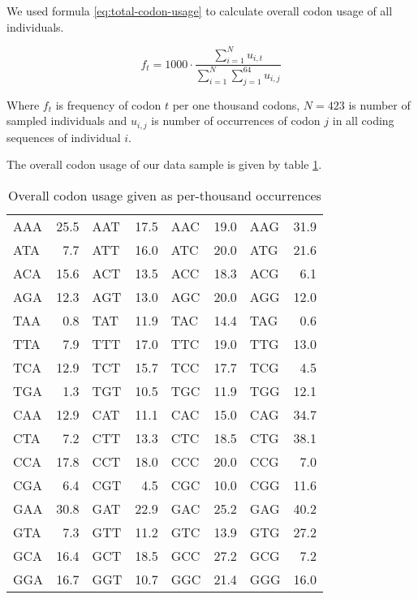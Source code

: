 \documentclass{article}
\begin{document}
We used formula \ref{eq:total-codon-usage} to calculate overall codon usage of
all individuals.

\begin{equation}
  \label{eq:total-codon-usage}
  f_{t} = 1000 \cdot \frac{\sum_{i = 1}^N u_{i, t}}{\sum_{i = 1}^N \sum_{j =
      1}^{64} u_{i, j}}
\end{equation}

Where $f_{t}$ is frequency of codon $t$ per one thousand codons, $N = 423$ is
number of sampled individuals and $u_{i, j}$ is number of occurrences of codon
$j$ in all coding sequences of individual $i$.

The overall codon usage of our data sample is given by table
\ref{table:overall-codon-usage}.

\begin{table}[h]
  \centering
  \begin{tabular}{|lr|lr|lr|lr|}
    \hline
    AAA & 25.5 & AAT & 17.5 & AAC & 19.0 & AAG & 31.9 \\
    ATA &  7.7 & ATT & 16.0 & ATC & 20.0 & ATG & 21.6 \\
    ACA & 15.6 & ACT & 13.5 & ACC & 18.3 & ACG &  6.1 \\
    AGA & 12.3 & AGT & 13.0 & AGC & 20.0 & AGG & 12.0 \\
    TAA &  0.8 & TAT & 11.9 & TAC & 14.4 & TAG &  0.6 \\
    TTA &  7.9 & TTT & 17.0 & TTC & 19.0 & TTG & 13.0 \\
    TCA & 12.9 & TCT & 15.7 & TCC & 17.7 & TCG &  4.5 \\
    TGA &  1.3 & TGT & 10.5 & TGC & 11.9 & TGG & 12.1 \\
    CAA & 12.9 & CAT & 11.1 & CAC & 15.0 & CAG & 34.7 \\
    CTA &  7.2 & CTT & 13.3 & CTC & 18.5 & CTG & 38.1 \\
    CCA & 17.8 & CCT & 18.0 & CCC & 20.0 & CCG &  7.0 \\
    CGA &  6.4 & CGT &  4.5 & CGC & 10.0 & CGG & 11.6 \\
    GAA & 30.8 & GAT & 22.9 & GAC & 25.2 & GAG & 40.2 \\
    GTA &  7.3 & GTT & 11.2 & GTC & 13.9 & GTG & 27.2 \\
    GCA & 16.4 & GCT & 18.5 & GCC & 27.2 & GCG &  7.2 \\
    GGA & 16.7 & GGT & 10.7 & GGC & 21.4 & GGG & 16.0 \\
    \hline
  \end{tabular}
  \caption{Overall codon usage given as per-thousand occurrences}
  \label{table:overall-codon-usage}
\end{table}
\end{document}
